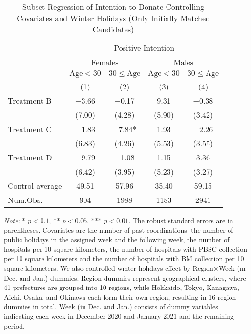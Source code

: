 \documentclass[12pt, a4paper]{article}
\begin{document}
\begin{table}[H]

\caption{\label{tab:lm-positive-subset3-init}Subset Regression of Intention to Donate Controlling Covariates and Winter Holidays (Only Initially Matched Candidates)}
\centering
\fontsize{8}{10}\selectfont
\begin{threeparttable}
\begin{tabular}[t]{lcccc}
\toprule
\multicolumn{1}{c}{ } & \multicolumn{4}{c}{Positive Intention} \\
\cmidrule(l{3pt}r{3pt}){2-5}
\multicolumn{1}{c}{ } & \multicolumn{2}{c}{Females} & \multicolumn{2}{c}{Males} \\
\cmidrule(l{3pt}r{3pt}){2-3} \cmidrule(l{3pt}r{3pt}){4-5}
\multicolumn{1}{c}{ } & \multicolumn{1}{c}{$\text{Age} < 30$} & \multicolumn{1}{c}{$30 \le \text{Age}$} & \multicolumn{1}{c}{$\text{Age} < 30$} & \multicolumn{1}{c}{$30 \le \text{Age}$} \\
\cmidrule(l{3pt}r{3pt}){2-2} \cmidrule(l{3pt}r{3pt}){3-3} \cmidrule(l{3pt}r{3pt}){4-4} \cmidrule(l{3pt}r{3pt}){5-5}
  & (1) & (2) & (3) & (4)\\
\midrule
Treatment B & \num{-3.66} & \num{-0.17} & \num{9.31} & \num{-0.38}\\
 & (\num{7.00}) & (\num{4.28}) & (\num{5.90}) & (\num{3.42})\\
Treatment C & \num{-1.83} & \num{-7.84}* & \num{1.93} & \num{-2.26}\\
 & (\num{6.83}) & (\num{4.26}) & (\num{5.53}) & (\num{3.55})\\
Treatment D & \num{-9.79} & \num{-1.08} & \num{1.15} & \num{3.36}\\
 & (\num{6.42}) & (\num{3.95}) & (\num{5.23}) & (\num{3.27})\\
\midrule
Control average & 49.51 & 57.96 & 35.40 & 59.15\\
Num.Obs. & \num{904} & \num{1988} & \num{1183} & \num{2941}\\
\bottomrule
\end{tabular}
\begin{tablenotes}
\item \emph{Note}: * $p < 0.1$, ** $p < 0.05$, *** $p < 0.01$. The robust standard errors are in parentheses. Covariates are the number of past coordinations, the number of public holidays in the assigned week and the following week, the number of hospitals per 10 square kilometers, the number of hospitals with PBSC collection per 10 square kilometers and the number of hospitals with BM collection per 10 square kilometers. We also controlled winter holidays effect by Region$\times$Week (in Dec. and Jan.) dummies. Region dummies represent geographical clusters, where 41 prefectures are grouped into 10 regions, while Hokkaido, Tokyo, Kanagawa, Aichi, Osaka, and Okinawa each form their own region, resulting in 16 region dummies in total. Week (in Dec. and Jan.) consists of dummy variables indicating each week in December 2020 and January 2021 and the remaining period.
\end{tablenotes}
\end{threeparttable}
\end{table}
\end{document}

